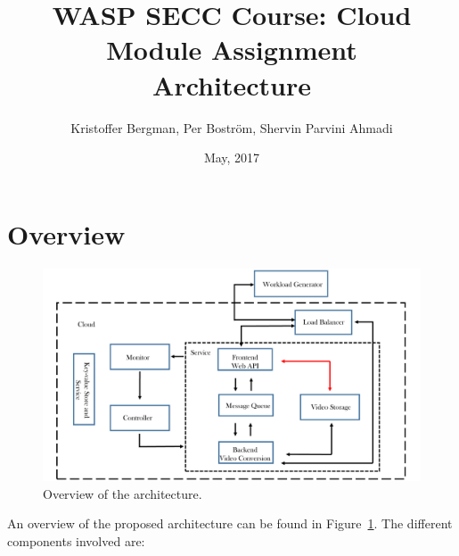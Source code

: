 \documentclass[a4paper, 10pt, english]{article}
\title{WASP SECC Course: Cloud Module Assignment\\Architecture}
\author{Kristoffer Bergman, Per Boström, Shervin Parvini Ahmadi}
\date{May, 2017}
\begin{document}
\maketitle

\section{Overview}

\begin{figure}
	\label{fig:architecture}
	\centering
	\includegraphics[width=1\textwidth]{figs/workflow.pdf}
	\caption{Overview of the architecture.}
\end{figure}
An overview of the proposed architecture can be found in Figure~\ref{fig:architecture}. The different components involved are:
\end{document}
